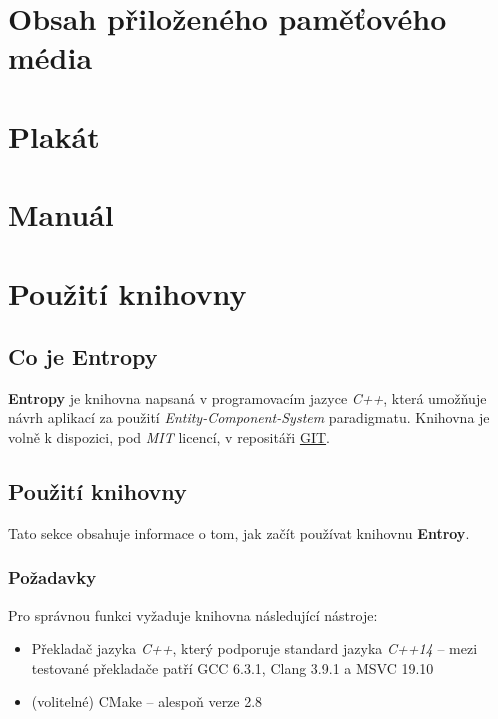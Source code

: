 
\chapter{Obsah přiloženého paměťového média}

\chapter{Plakát}

\chapter{Manuál}

\chapter{Použití knihovny}

\section*{Co je Entropy}

\textbf{Entropy} je knihovna napsaná v programovacím jazyce \emph{C++}, která umožňuje návrh aplikací za použití \emph{Entity-Component-System} paradigmatu. Knihovna je volně k dispozici, pod \emph{MIT} licencí, v repositáři \href{https://github.com/T0mt0mp/Entropy}{GIT}. 

\section*{Použití knihovny}

Tato sekce obsahuje informace o tom, jak začít používat knihovnu \textbf{Entroy}.

\subsection*{Požadavky}

Pro správnou funkci vyžaduje knihovna následující nástroje: 
\begin{itemize}
	\item Překladač jazyka \emph{C++}, který podporuje standard jazyka \emph{C++14} -- mezi testované překladače patří GCC 6.3.1, Clang 3.9.1 a MSVC 19.10
	\item (volitelné) CMake -- alespoň verze 2.8
\end{itemize}

